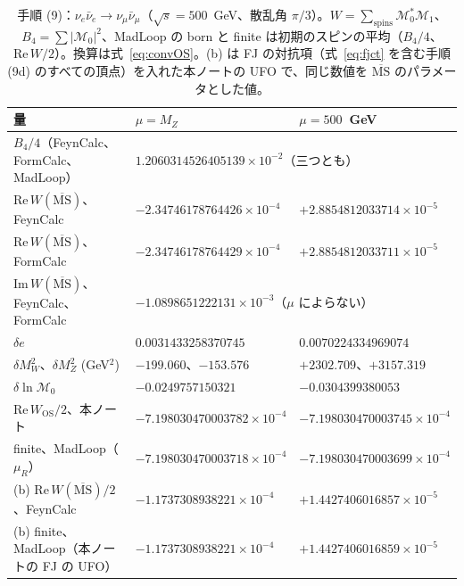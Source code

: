 \documentclass[a4paper,10pt]{ltjsarticle}
\newcommand{\MSbar}{\overline{\mathrm{MS}}}
\newcommand{\re}{\mathrm{Re}\,}
\newcommand{\im}{\mathrm{Im}\,}
\begin{document}
\begin{table}[tbp]
\centering\footnotesize
\caption{手順 (9)：$\nu_e\bar\nu_e\to\nu_\mu\bar\nu_\mu$（$\sqrt s=500$~GeV、散乱角 $\pi/3$）。$W=\sum_{\mathrm{spins}}\mathcal M_0^*\mathcal M_1$、$B_4=\sum|\mathcal M_0|^2$、MadLoop の born と finite は初期のスピンの平均（$B_4/4$、$\re W/2$）。換算は式~\eqref{eq:convOS}。(b) は FJ の対抗項（式~\eqref{eq:fjct} を含む手順 (9d) のすべての頂点）を入れた本ノートの UFO で、同じ数値を $\MSbar$ のパラメータとした値。}
\label{tab:nunu}
\begin{tabular}{lll}
\toprule
量 & $\mu=M_Z$ & $\mu=500$~GeV \\
\midrule
$B_4/4$（FeynCalc、FormCalc、MadLoop） & \multicolumn{2}{l}{$1.2060314526405139\times10^{-2}$（三つとも）} \\
$\re W(\MSbar)$、FeynCalc & $-2.34746178764426\times10^{-4}$ & $+2.8854812033714\times10^{-5}$ \\
$\re W(\MSbar)$、FormCalc & $-2.34746178764429\times10^{-4}$ & $+2.8854812033711\times10^{-5}$ \\
$\im W(\MSbar)$、FeynCalc、FormCalc & \multicolumn{2}{l}{$-1.0898651222131\times10^{-3}$（$\mu$ によらない）} \\
$\delta e$ & $0.0031433258370745$ & $0.0070224334969074$ \\
$\delta M_W^2$、$\delta M_Z^2$ (GeV$^2$) & $-199.060$、$-153.576$ & $+2302.709$、$+3157.319$ \\
$\delta\ln\mathcal M_0$ & $-0.0249757150321$ & $-0.0304399380053$ \\
$\re W_{\mathrm{OS}}/2$、本ノート & $-7.198030470003782\times10^{-4}$ & $-7.198030470003745\times10^{-4}$ \\
finite、MadLoop（$\mu_R$） & $-7.198030470003718\times10^{-4}$ & $-7.198030470003699\times10^{-4}$ \\
\midrule
(b) $\re W(\MSbar)/2$、FeynCalc & $-1.1737308938221\times10^{-4}$ & $+1.4427406016857\times10^{-5}$ \\
(b) finite、MadLoop（本ノートの FJ の UFO） & $-1.1737308938221\times10^{-4}$ & $+1.4427406016859\times10^{-5}$ \\
\bottomrule
\end{tabular}
\end{table}
\end{document}
